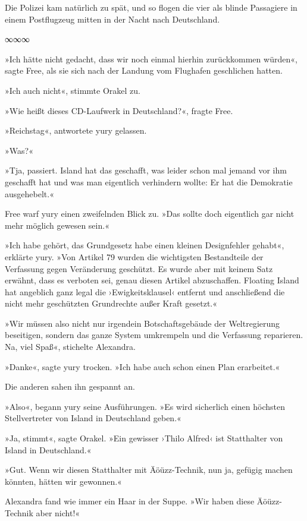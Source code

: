 Die Polizei kam natürlich zu spät, und so flogen die vier als blinde Passagiere in einem Postflugzeug mitten in der Nacht nach Deutschland.

\begin{center}
    ∞∞∞
\end{center}

»Ich hätte nicht gedacht, dass wir noch einmal hierhin zurückkommen würden«, sagte Free, als sie sich nach der Landung vom Flughafen geschlichen hatten.

»Ich auch nicht«, stimmte Orakel zu.

»Wie heißt dieses CD-Laufwerk in Deutschland?«, fragte Free.

»Reichstag«, antwortete yury gelassen.

»Was?«

»Tja, passiert. Island hat das geschafft, was leider schon mal jemand vor ihm geschafft hat und was man eigentlich verhindern wollte: Er hat die Demokratie ausgehebelt.«

Free warf yury einen zweifelnden Blick zu. »Das sollte doch eigentlich gar nicht mehr möglich gewesen sein.«

»Ich habe gehört, das Grundgesetz habe einen kleinen Designfehler gehabt«, erklärte yury. »Von Artikel 79 wurden die wichtigsten Bestandteile der Verfassung gegen Veränderung geschützt. Es wurde aber mit keinem Satz erwähnt, dass es verboten sei, genau diesen Artikel abzuschaffen. Floating Island hat angeblich ganz legal die ›Ewigkeitsklausel‹ entfernt und anschließend die nicht mehr geschützten Grundrechte außer Kraft gesetzt.«

»Wir müssen also nicht nur irgendein Botschaftsgebäude der Weltregierung beseitigen, sondern das ganze System umkrempeln und die Verfassung reparieren. Na, viel Spaß«, stichelte Alexandra.

»Danke«, sagte yury trocken. »Ich habe auch schon einen Plan erarbeitet.«

Die anderen sahen ihn gespannt an.

»Also«, begann yury seine Ausführungen. »Es wird sicherlich einen höchsten Stellvertreter von Island in Deutschland geben.«

»Ja, stimmt«, sagte Orakel. »Ein gewisser ›Thilo Alfred‹ ist Statthalter von Island in Deutschland.«

»Gut. Wenn wir diesen Statthalter mit Äöüzz-Technik, nun ja, gefügig machen könnten, hätten wir gewonnen.«

Alexandra fand wie immer ein Haar in der Suppe. »Wir haben diese Äöüzz-Technik aber nicht!«

